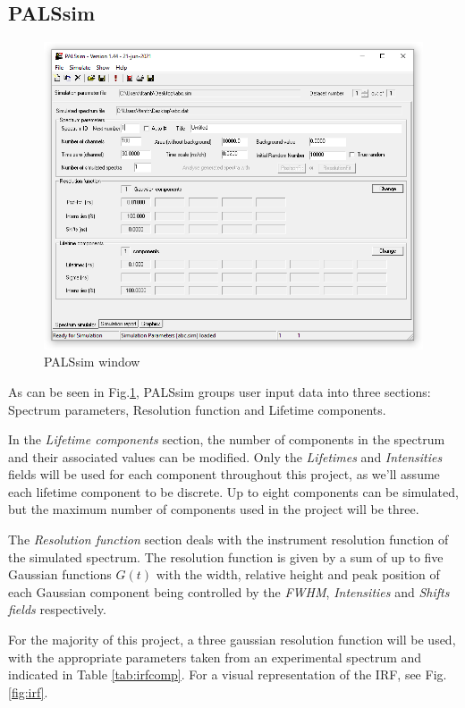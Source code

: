 \subsection{PALSsim}
\begin{figure}
    \centering
    \includegraphics[width=0.8\linewidth]{PALSsim.PNG}
    \caption{PALSsim window}
    \label{fig:Psim}
\end{figure}

As can be seen in Fig.\ref{fig:Psim}, PALSsim groups user input data into three sections: Spectrum parameters, Resolution function and Lifetime components.

In the \textit{Lifetime components} section, the number of components in the spectrum and their associated values can be modified. Only the \textit{Lifetimes} and \textit{Intensities} fields will be used for each component throughout this project, as we'll assume each lifetime component to be discrete. Up to eight components can be simulated, but the maximum number of components used in the project will be three.

The \textit{Resolution function} section deals with the instrument resolution function of the simulated spectrum. The resolution function is given by a sum of up to five Gaussian functions $G(t)$ with the width, relative height and peak position of each Gaussian component being controlled by the \textit{FWHM}, \textit{Intensities} and \textit{Shifts fields} respectively.

For the majority of this project, a three gaussian resolution function will be used, with the appropriate parameters taken from an experimental spectrum and indicated in Table \ref{tab:irfcomp}. For a visual representation of the IRF, see Fig. \ref{fig:irf}.

